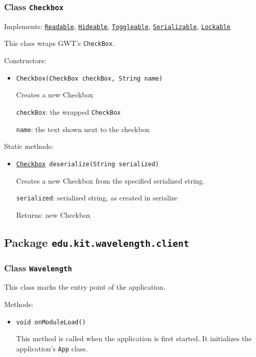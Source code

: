 \subsubsection{Class \texttt{Checkbox}}
\label{type:edu.kit.wavelength.client.view.webui.component.Checkbox}
Implements: \texttt{\hyperref[type:edu.kit.wavelength.client.view.api.Readable]{Readable}}, \texttt{\hyperref[type:edu.kit.wavelength.client.view.api.Hideable]{Hideable}}, \texttt{\hyperref[type:edu.kit.wavelength.client.view.api.Toggleable]{Toggleable}}, \texttt{\hyperref[type:edu.kit.wavelength.client.model.serialization.Serializable]{Serializable}}, \texttt{\hyperref[type:edu.kit.wavelength.client.view.api.Lockable]{Lockable}}

This class wraps GWT's \texttt{CheckBox}.

Constructors:
\begin{itemize}
\item \texttt{Checkbox(CheckBox checkBox, String name)}

Creates a new Checkbox

\texttt{checkBox}: the wrapped \texttt{CheckBox}

\texttt{name}: the text shown next to the checkbox

\end{itemize}

Static methods:
\begin{itemize}
\item \texttt{\hyperref[type:edu.kit.wavelength.client.view.webui.component.Checkbox]{Checkbox} deserialize(String serialized)}

Creates a new Checkbox from the specified serialized string.

\texttt{serialized}: serialized string, as created in serialize

Returns: new Checkbox

\end{itemize}

\subsection{Package \lstinline{edu.kit.wavelength.client}}
\label{pkg:edu.kit.wavelength.client}


\subsubsection{Class \texttt{Wavelength}}
\label{type:edu.kit.wavelength.client.Wavelength}
This class marks the entry point of the application.

Methods:
\begin{itemize}
\item \texttt{void onModuleLoad()}

This method is called when the application is first started. It initializes
 the application's \texttt{App} class.

\end{itemize}

